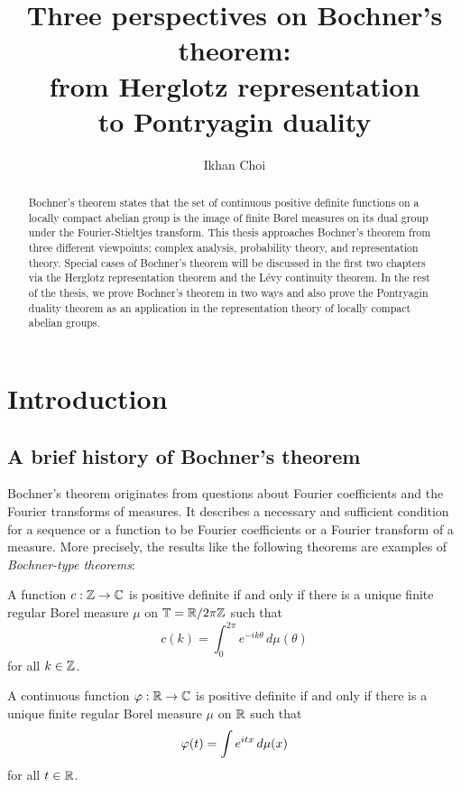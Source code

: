 \documentclass{../../small}
\title{Three perspectives on Bochner's theorem:\\from Herglotz representation\\to Pontryagin duality}
\author{Ikhan Choi}
\date{}
\begin{document}
\maketitle
\begin{abstract}
Bochner's theorem states that the set of continuous positive definite functions on a locally compact abelian group is the image of finite Borel measures on its dual group under the Fourier-Stieltjes transform.
This thesis approaches Bochner's theorem from three different viewpoints; complex analysis, probability theory, and representation theory.
Special cases of Bochner's theorem will be discussed in the first two chapters via the Herglotz representation theorem and the L\'evy continuity theorem.
In the rest of the thesis, we prove Bochner's theorem in two ways and also prove the Pontryagin duality theorem as an application in the representation theory of locally compact abelian groups.
\end{abstract}
\tableofcontents









\newpage
\section{Introduction}



\subsection{A brief history of Bochner's theorem}

Bochner's theorem originates from questions about Fourier coefficients and the Fourier transforms of measures.
It describes a necessary and sufficient condition for a sequence or a function to be Fourier coefficients or a Fourier transform of a measure.
More precisely, the results like the following theorems are examples of \emph{Bochner-type theorems}:
\begin{thm}
A function $c:\mathbb{Z}\to\mathbb{C}$ is positive definite if and only if there is a unique finite regular Borel measure $\mu$ on $\mathbb{T}=\mathbb{R}/2\pi\mathbb{Z}$ such that
\[c(k)=\int_0^{2\pi}e^{-ik\theta}\,d\mu(\theta)\]
for all $k\in\mathbb{Z}$.
\end{thm}
\begin{thm}
A continuous function $\varphi:\mathbb{R}\to\mathbb{C}$ is positive definite if and only if there is a unique finite regular Borel measure $\mu$ on $\mathbb{R}$ such that
\[\varphi(t)=\int e^{itx}\,d\mu(x)\]
for all $t\in\mathbb{R}$.
\end{thm}
\end{document}
